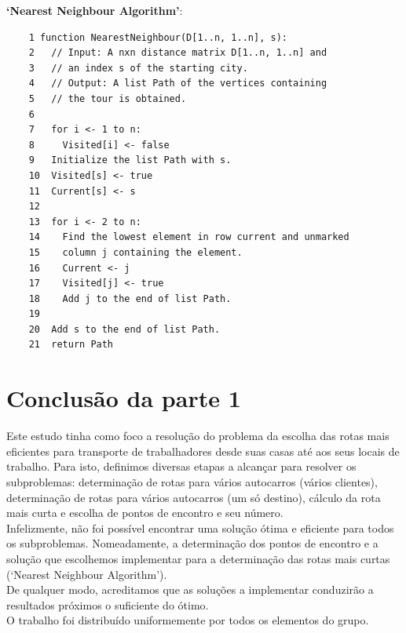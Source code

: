 \documentclass{report}
\begin{document}
    \textbf{`Nearest Neighbour Algorithm'\cite{PSEUDONNA}}:\\
    \begin{lstlisting}
    1 function NearestNeighbour(D[1..n, 1..n], s):
    2   // Input: A nxn distance matrix D[1..n, 1..n] and
    3   // an index s of the starting city.
    4   // Output: A list Path of the vertices containing
    5   // the tour is obtained.
    6
    7   for i <- 1 to n:
    8     Visited[i] <- false
    9   Initialize the list Path with s.
    10  Visited[s] <- true
    11  Current[s] <- s
    12
    13  for i <- 2 to n:
    14    Find the lowest element in row current and unmarked
    15    column j containing the element.
    16    Current <- j
    17    Visited[j] <- true
    18    Add j to the end of list Path.
    19
    20  Add s to the end of list Path.
    21  return Path
    \end{lstlisting}

\chapter{Conclusão da parte 1}
  Este estudo tinha como foco a resolução do problema da escolha das rotas mais
  eficientes para transporte de trabalhadores desde suas casas até aos seus locais
  de trabalho. Para isto, definimos diversas etapas a alcançar para resolver os
  subproblemas: determinação de rotas para vários autocarros (vários clientes),
  determinação de rotas para vários autocarros (um só destino), cálculo da rota
  mais curta e escolha de pontos de encontro e seu número.\\
  Infelizmente, não foi possível encontrar uma solução ótima e eficiente para
  todos os subproblemas. Nomeadamente, a determinação dos pontos de encontro e
  a solução que escolhemos implementar para a determinação das rotas mais
  curtas (`Nearest Neighbour Algorithm').\\
  \newline
  De qualquer modo, acreditamos que as soluções a implementar conduzirão a
  resultados próximos o suficiente do ótimo.\\
  \newline
  O trabalho foi distribuído uniformemente por todos os elementos do grupo.
\end{document}
